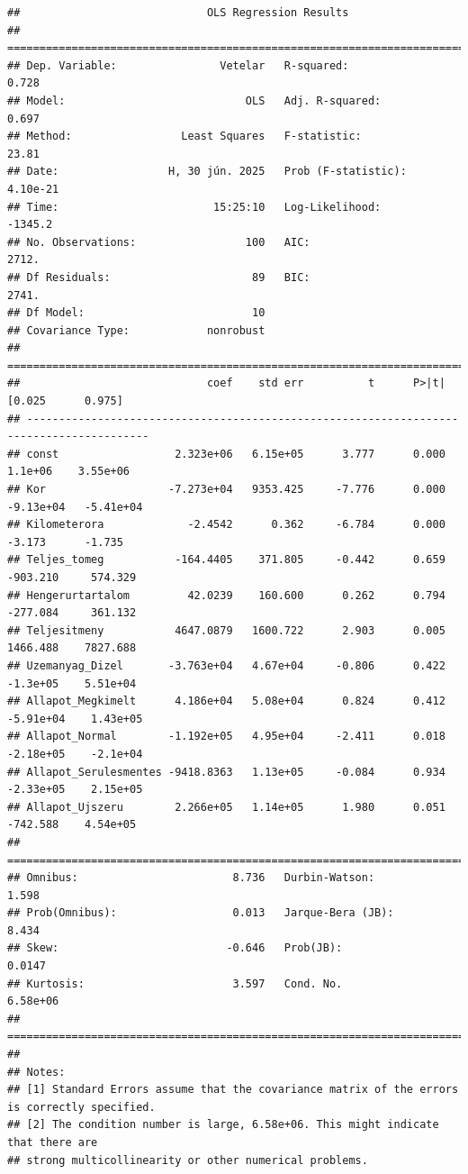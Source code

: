 \documentclass[
]{book}
\begin{document}
\begin{verbatim}
##                             OLS Regression Results                            
## ==============================================================================
## Dep. Variable:                Vetelar   R-squared:                       0.728
## Model:                            OLS   Adj. R-squared:                  0.697
## Method:                 Least Squares   F-statistic:                     23.81
## Date:                 H, 30 jún. 2025   Prob (F-statistic):           4.10e-21
## Time:                        15:25:10   Log-Likelihood:                -1345.2
## No. Observations:                 100   AIC:                             2712.
## Df Residuals:                      89   BIC:                             2741.
## Df Model:                          10                                         
## Covariance Type:            nonrobust                                         
## =========================================================================================
##                             coef    std err          t      P>|t|      [0.025      0.975]
## -----------------------------------------------------------------------------------------
## const                  2.323e+06   6.15e+05      3.777      0.000     1.1e+06    3.55e+06
## Kor                   -7.273e+04   9353.425     -7.776      0.000   -9.13e+04   -5.41e+04
## Kilometerora             -2.4542      0.362     -6.784      0.000      -3.173      -1.735
## Teljes_tomeg           -164.4405    371.805     -0.442      0.659    -903.210     574.329
## Hengerurtartalom         42.0239    160.600      0.262      0.794    -277.084     361.132
## Teljesitmeny           4647.0879   1600.722      2.903      0.005    1466.488    7827.688
## Uzemanyag_Dizel       -3.763e+04   4.67e+04     -0.806      0.422    -1.3e+05    5.51e+04
## Allapot_Megkimelt      4.186e+04   5.08e+04      0.824      0.412   -5.91e+04    1.43e+05
## Allapot_Normal        -1.192e+05   4.95e+04     -2.411      0.018   -2.18e+05    -2.1e+04
## Allapot_Serulesmentes -9418.8363   1.13e+05     -0.084      0.934   -2.33e+05    2.15e+05
## Allapot_Ujszeru        2.266e+05   1.14e+05      1.980      0.051    -742.588    4.54e+05
## ==============================================================================
## Omnibus:                        8.736   Durbin-Watson:                   1.598
## Prob(Omnibus):                  0.013   Jarque-Bera (JB):                8.434
## Skew:                          -0.646   Prob(JB):                       0.0147
## Kurtosis:                       3.597   Cond. No.                     6.58e+06
## ==============================================================================
## 
## Notes:
## [1] Standard Errors assume that the covariance matrix of the errors is correctly specified.
## [2] The condition number is large, 6.58e+06. This might indicate that there are
## strong multicollinearity or other numerical problems.
\end{verbatim}
\end{document}
